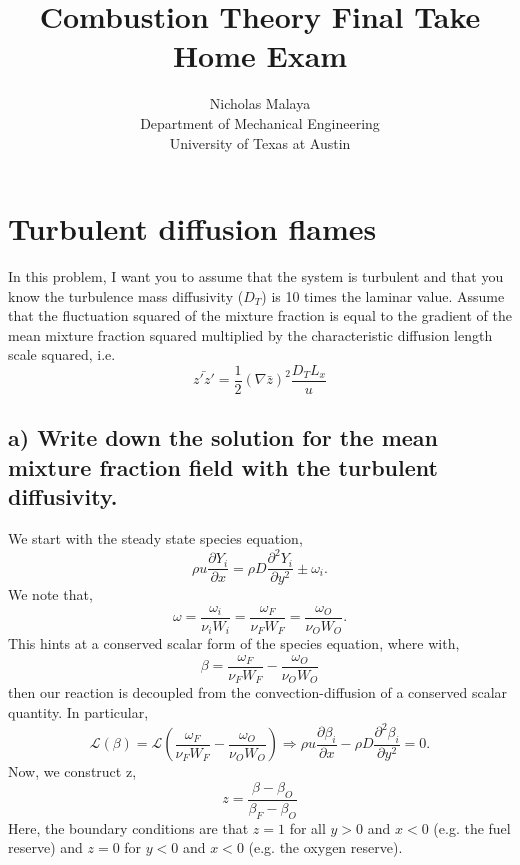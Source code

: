 \documentclass{article}
\title{Combustion Theory Final Take Home Exam}
\author{Nicholas Malaya\\ Department of Mechanical Engineering \\
University of Texas at Austin}
\date{}
\begin{document}
\maketitle
\newpage


\section*{Turbulent diffusion flames}

In this problem, I want you to assume that the system is turbulent and
that you know the turbulence mass diffusivity ($D_T$) is 10 times the
laminar value. Assume that the fluctuation squared of the mixture
fraction is equal to the gradient of the mean mixture fraction squared
multiplied by the characteristic diffusion length scale squared, i.e.
\begin{equation}
 \bar{z'z'} = \frac{1}{2} (\nabla \bar z)^2 \frac{D_T L_x}{u}
\end{equation}

\subsection*{a) Write down the solution for the mean mixture fraction
field with the turbulent diffusivity.}

We start with the steady state species equation, 
\begin{equation}
 \rho u \frac{\partial Y_i}{\partial x} = \rho D \frac{\partial^2
  Y_i}{\partial y^2} \pm \omega_i. 
\end{equation}
We note that, 
\begin{equation}
 \omega = \frac{\omega_i}{\nu_i W_i} = \frac{\omega_F}{\nu_F W_F} =
  \frac{\omega_O}{\nu_O W_O}. 
\end{equation}
This hints at a conserved scalar form of the species equation, where
with, 
\begin{equation}
 \beta  = \frac{\omega_F}{\nu_F W_F} - \frac{\omega_O}{\nu_O W_O}
\end{equation}
then our reaction is decoupled from the convection-diffusion of a
conserved scalar quantity. In particular, 
\begin{equation}
 \mathcal{L}(\beta)  = \mathcal{L}\left(\frac{\omega_F}{\nu_F W_F} -
				   \frac{\omega_O}{\nu_O W_O} \right)
 \Rightarrow \rho u \frac{\partial \beta_i}{\partial x} - \rho D \frac{\partial^2
  \beta_i}{\partial y^2} = 0. 
\end{equation}
Now, we construct z, 
\begin{equation}
 z = \frac{\beta -\beta_{O}}{\beta_F - \beta_{O}}
\end{equation}
Here, the boundary conditions are that $z=1$ for all $y>0$ and $x<0$
(e.g. the fuel reserve) and $z=0$ for $y<0$ and $x<0$ (e.g. the oxygen
reserve). 
\end{document}
